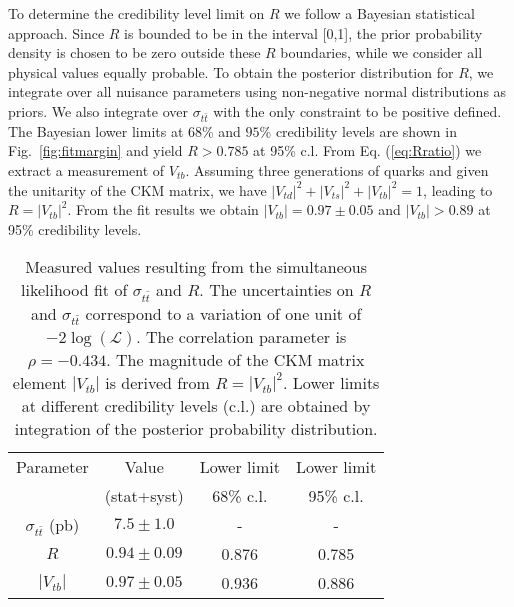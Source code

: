 \documentclass[aps,prd,twocolumn,superscriptaddress,showpacs]{revtex4}
\begin{document}
To determine the credibility level limit on $R$ 
we follow a Bayesian statistical approach. Since $R$ is bounded to be in 
the interval [0,1], the prior probability density 
is chosen to be zero outside these $R$ boundaries, 
while we consider all physical values equally probable. To obtain the posterior distribution for $R$, 
we integrate over all nuisance parameters using non-negative normal distributions as priors. 
We also integrate over $\sigma_{t\bar{t}}$
with the only constraint to be positive defined. 
The Bayesian lower limits at 
$68$\% and $95$\% credibility levels  are shown in 
Fig.~\ref{fig:fitmargin} and yield $R>0.785$ at 95\% c.l. 
From Eq. (\ref{eq:Rratio}) we extract a measurement of $V_{tb}$. Assuming 
three generations of quarks and given the unitarity of the CKM matrix, we have 
$\left|V_{td}\right|^{2}+\left|V_{ts}\right|^{2}+\left|V_{tb}\right|^{2}=1$,
leading to $R=\left|V_{tb}\right|^{2}$. 
From the fit results we obtain $\left|V_{tb}\right|=0.97\pm0.05$ and 
$\left|V_{tb}\right|>0.89$ at 95\% credibility levels.

 
 \begin{table}[thb]
\caption{Measured values resulting from the simultaneous likelihood fit of
$\sigma_{t\bar{t}}$ and $R$. The uncertainties on $R$ and $\sigma_{t\bar{t}}$ correspond to a variation of one  unit 
of $-2\log\left(\mathcal{L}\right)$. The correlation parameter is 
$\rho = - 0.434$. The magnitude of the CKM matrix element $\left|V_{tb}\right|$  is 
derived from $R=\left|V_{tb}\right|^{2}$. Lower limits at different 
credibility levels (c.l.) are obtained by
 integration of the posterior probability distribution.}
 \centering
 \begin{tabular}{cccc}
 \hline \hline
 Parameter                                   & Value          & Lower limit           & Lower limit  \\
                                             & (stat+syst)                          
&     68\% c.l.         &  95\% c.l.  \\
 \hline
 $\sigma_{t\bar{t}}$ (pb) & $7.5 \pm 1.0 $  &       -             &       -            \\
 $R$                                            & $0.94 \pm 0.09$ &      0.876          &      0.785         \\
 $\left|V_{tb}\right|$                        & $0.97 \pm 0.05$ &      0.936          &      0.886         \\
 \hline \hline
 \end{tabular}
 \label{table:resultssum}
 \end{table}
 
\end{document}
